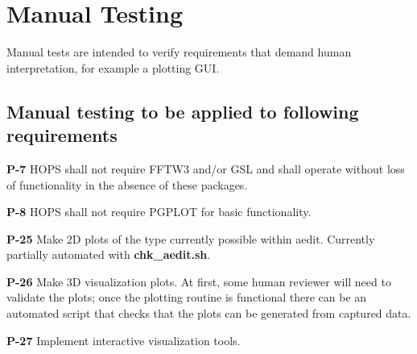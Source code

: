%
%
\section{Manual Testing}
\label{sec:manual}

Manual tests are intended to verify requirements that demand human interpretation, for example a plotting GUI.


\subsection{Manual testing to be applied to following requirements}
\label{sec:manreqs}

\begin{description}
  
\item{\textbf{P-7}} HOPS shall not require FFTW3 and/or GSL and shall operate without loss of functionality in the absence of these packages.
\item{\textbf{P-8}} HOPS shall not require PGPLOT for basic functionality.
\item{\textbf{P-25}} Make 2D plots of the type currently possible within aedit. Currently partially automated with \textbf{chk\_aedit.sh}.
\item{\textbf{P-26}} Make 3D visualization plots. At first, some human reviewer will need to validate the plots; once the plotting routine is functional there can be an automated script that checks that the plots can be generated from captured data.
\item{\textbf{P-27}} Implement interactive visualization tools.

\end{description}
  



